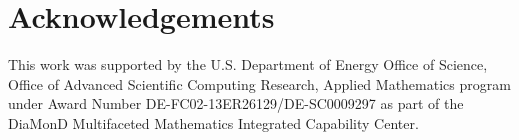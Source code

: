 \documentclass[review]{siamart0516}
\providecommand{\DIFdelbegin}{} %
\providecommand{\DIFdelend}{} %
\newcommand{\DIFscaledelfig}{0.5}
\newlength{\DIFdelgraphicswidth} %
\newlength{\DIFdelgraphicsheight} %
\newcommand{\DIFdelincludegraphics}[2][]{%
\sbox{\DIFdelgraphicsbox}{\DIFOincludegraphics[#1]{#2}}%
\settoboxwidth{\DIFdelgraphicswidth}{\DIFdelgraphicsbox} %
\settoboxtotalheight{\DIFdelgraphicsheight}{\DIFdelgraphicsbox} %
\scalebox{\DIFscaledelfig}{%
\parbox[b]{\DIFdelgraphicswidth}{\usebox{\DIFdelgraphicsbox}\\[-\baselineskip] \rule{\DIFdelgraphicswidth}{0em}}\llap{\resizebox{\DIFdelgraphicswidth}{\DIFdelgraphicsheight}{%
\setlength{\unitlength}{\DIFdelgraphicswidth}%
\begin{picture}(1,1)%
\thicklines\linethickness{2pt} %
{\color[rgb]{1,0,0}\put(0,0){\framebox(1,1){}}}%
{\color[rgb]{1,0,0}\put(0,0){\line( 1,1){1}}}%
{\color[rgb]{1,0,0}\put(0,1){\line(1,-1){1}}}%
\end{picture}%
}\hspace*{3pt}}} %
} %
\DeclareRobustCommand{\DIFdelbegin}{\DIFOdelbegin \let\includegraphics\DIFdelincludegraphics} %
\DeclareRobustCommand{\DIFdelend}{\DIFOaddend \let\includegraphics\DIFOincludegraphics} %
\begin{document}
\DIFdelbegin %

\DIFdelend \section*{Acknowledgements}

This work was supported by the U.S. Department of Energy Office of Science, Office of Advanced Scientific
Computing Research, Applied Mathematics program under Award Number DE-FC02-13ER26129/DE-SC0009297 as part of the
DiaMonD Multifaceted Mathematics Integrated Capability Center.
\end{document}
